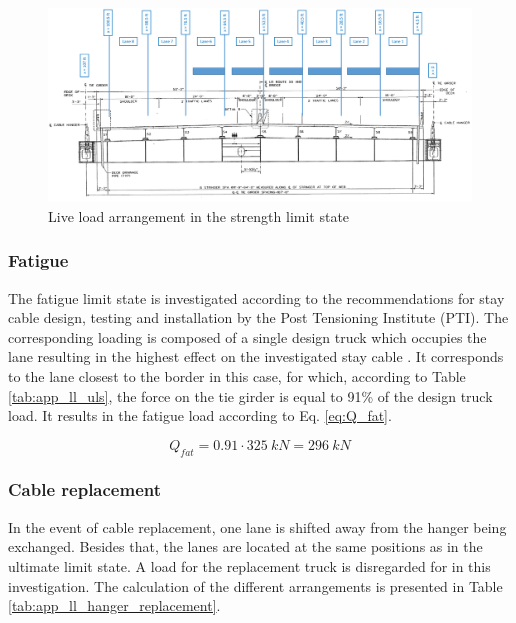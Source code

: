 \begin{figure}[H]
    \centering
    \includegraphics[width=\textwidth]{overleaf/Appendix/Pictures/Cross_Section_LL_ULS.PNG}
    \caption{Live load arrangement in the strength limit state}
    \label{fig:app_hangers_uls}
\end{figure}


\subsubsection*{Fatigue} \label{Appendx_A_Live_loading_15}
The fatigue limit state is investigated according to the recommendations for stay cable design, testing and installation by the Post Tensioning Institute (PTI). The corresponding loading is composed of a single design truck which occupies the lane resulting in the highest effect on the investigated stay cable \cite{PTI}. It corresponds to the lane closest to the border in this case, for which, according to Table \ref{tab:app_ll_uls}, the force on the tie girder is equal to 91\% of the design truck load. It results in the fatigue load according to Eq. \ref{eq:Q_fat}.

\begin{equation}
    Q_{fat} = 0.91 \cdot \SI{325}{kN} = \SI{296}{kN}
    \label{eq:Q_fat}
\end{equation}

\subsubsection*{Cable replacement} \label{Appendx_A_Live_loading_2}
In the event of cable replacement, one lane is shifted away from the hanger being exchanged. Besides that, the lanes are located at the same positions as in the ultimate limit state. A load for the replacement truck is disregarded for in this investigation. The calculation of the different arrangements is presented in Table \ref{tab:app_ll_hanger_replacement}.


